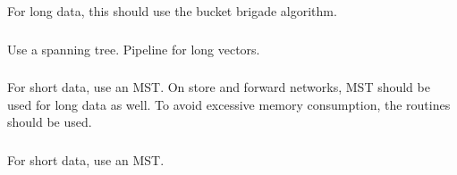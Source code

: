 \documentclass{article}
\begin{document}
For long data, this should use the bucket brigade algorithm.

\subsubsection{}
Use a spanning tree.  Pipeline for long vectors.

\subsubsection{}
For short data, use an MST. On store and forward networks, MST should be used
for long data as well.  To avoid excessive memory consumption, the
 routines should be used.

\subsubsection{}
For short data, use an MST. 
\end{document}
